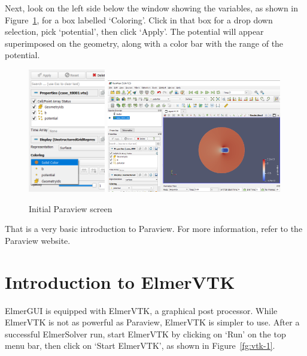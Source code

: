 \newpage

Next, look on the left side below the window showing the variables, as shown in Figure~\ref{fg:para-5}, for a box labelled `Coloring'.  Click in that box for a drop down selection, pick `potential', then click `Apply'.  The potential will appear superimposed on the geometry, along with a color bar with the range of the potential.

\begin{figure}[H]
\begin{center}
\includegraphics[width=0.3\textwidth]{para-5}
\includegraphics[width=0.68\textwidth]{para-6}
\caption{Initial Paraview screen}\label{fg:para-5}
\end{center}
\end{figure}

That is a very basic introduction to Paraview.  For more information, refer to the  Paraview website.

\chapter{Introduction to ElmerVTK}

ElmerGUI is equipped with ElmerVTK, a graphical post processor.  While ElmerVTK is not as powerful as Paraview, ElmerVTK is simpler to use.  After a successful ElmerSolver run, start ElmerVTK by clicking on `Run' on the top menu bar, then click on `Start ElmerVTK',  as shown in Figure~\ref{fg:vtk-1}.

